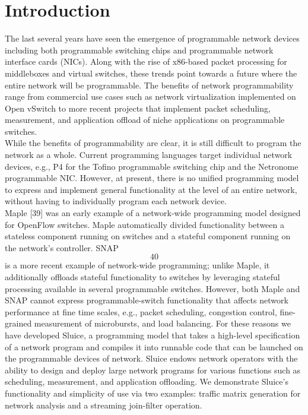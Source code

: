 \section{Introduction}
The last several years have seen the emergence of programmable network devices including both programmable switching chips and programmable network interface cards (NICs). Along with the rise of x86-based packet processing for middleboxes and virtual switches, these trends point towards a future where the entire network will be programmable. The benefits of network programmability range from commercial use cases such as network virtualization implemented on Open vSwitch to more recent projects that implement packet scheduling, measurement, and application offload of niche applications on programmable switches. \\
\indent While the benefits of programmability are clear, it is still difficult to program the network as a whole. Current programming languages target individual network devices, e.g., P4 for the Tofino programmable switching chip and the Netronome programmable NIC. However, at present, there is no unified programming model to express and implement general functionality at the level of an entire network, without having to individually program each network device.\\
\indent Maple [39] was an early example of a network-wide programming model designed for OpenFlow switches. Maple automatically divided functionality between a stateless component running on switches and a stateful component running on the network's controller. SNAP \[40\] is a more recent example of network-wide programming; unlike Maple, it additionally offloads stateful functionality to switches by leveraging stateful processing available in several programmable switches. However, both Maple and SNAP cannot express programmable-switch functionality that affects network performance at fine time scales, e.g., packet scheduling, congestion control, fine-grained measurement of microbursts, and load balancing. For these reasons we have developed Sluice, a programming model that takes a high-level specification of a network program and compiles it into runnable code that can be launched on the programmable devices of network. Sluice endows network operators with the ability to design and deploy large network programs for various functions such as scheduling, measurement, and application offloading. We demonstrate Sluice's functionality and simplicity of use via two examples: traffic matrix generation for network analysis and a streaming join-filter operation.

